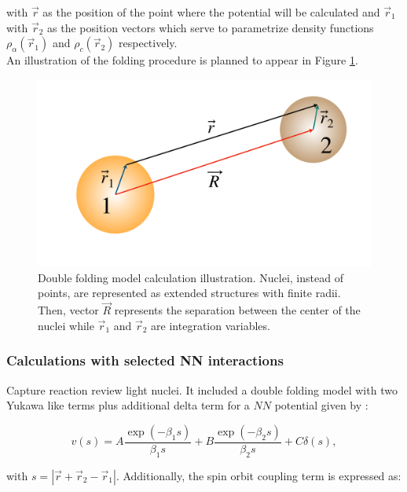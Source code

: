 \documentclass[openany]{book}
\begin{document}
with $\vec r$ as the position of the point where the potential will be calculated and $\vec r_1$ with $\vec r_2$ as the position vectors which serve to parametrize density functions  $\rho_\alpha(\vec r_1)$ and  $\rho_c(\vec r_2)$ respectively. \\

An illustration of the folding procedure is planned to appear in Figure \ref{fig:DoubleFolding}.

\begin{figure}[H]
	\centering 
	\includegraphics[scale=0.25]{Graphs/DoubleFolding.pdf}
	\caption[Double folding model calculation illustration]{Double folding model calculation illustration. Nuclei, instead of points, are represented as extended structures with finite radii. Then, vector $\vec R$ represents the separation between the center of the nuclei while $\vec r_1$ and $\vec r_2$ are integration variables. }
	\label{fig:DoubleFolding}
\end{figure}


\subsubsection{Calculations with selected NN interactions}

Capture reaction review light nuclei. It included a double folding model with two Yukawa like terms plus additional delta term  for a $NN$ potential given by  \cite{ghasemi_sadeghi_2018}:

\begin{equation}\label{eq:potential_NN_YukawaDelta}
	v(s) = A \frac{\exp {(-\beta_1 s)}}{\beta_1 s} + B \frac{\exp {(-\beta_2 s)}}{\beta_2 s} + C \delta(s),
\end{equation}

with $s = |\vec r + \vec r_2 - \vec r_1|$. Additionally, the spin orbit coupling term is expressed as: 
\end{document}
